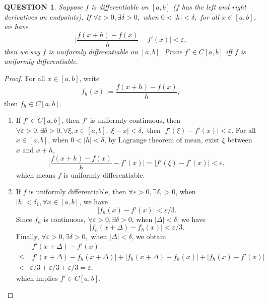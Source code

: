 \documentclass[12pt]{article}
\renewcommand{\(}{\left(}%
\renewcommand{\)}{\right)}%
\renewcommand{\[}{\left[}%
\renewcommand{\]}{\right]}%
\newtheorem{question}{QUESTION}[section]}
\newtheorem{proof}{Proof.}}
\begin{document}
  \begin{question}
   Suppose $f$ is differentiable on $[a,b]$ ($f$ has the left and right derivatives on endpoints). If $\forall\varepsilon>0,\exists\delta>0,$ when $0<|h|<\delta,$ for all $x\in[a,b]$, we have
   \begin{equation*}
    \bigg|\frac{f(x+h)-f(x)}{h}-f'(x)\bigg|<\varepsilon,
   \end{equation*}
   then we say $f$ is uniformly differentiable on $[a,b]$. Prove $f'\in C[a,b]$ iff $f$ is uniformly differentiable.
  \end{question}
  \begin{proof}
   For all $x\in[a,b]$, write
   \begin{equation*}
    f_h(x):=\frac{f(x+h)-f(x)}{h},
   \end{equation*}
   then $f_h\in C[a,b]$.
   \begin{enumerate}
    \item If $f'\in C[a,b]$, then $f'$ is uniformly continuous, then $\forall\varepsilon>0,\exists\delta>0,\forall \xi,x\in[a,b],|\xi-x |<\delta,$ then $|f'(\xi)-f'(x)|<\varepsilon$. For all $x\in[a,b]$, when $0<|h|<\delta$, by Lagrange theorem of mean, exist $\xi$ between $x$ and $x+h$,
    \begin{equation*}
     \bigg|\frac{f(x+h)-f(x)}{h}-f'(x)\bigg|=|f'(\xi )-f'(x)|<\varepsilon,
    \end{equation*}
    which means $f$ is uniformly differentiable.
    \item If $f$ is uniformly differentiable, then $\forall \varepsilon>0,\exists\delta_1>0$, when $|h|<\delta_1, \forall x\in[a,b]$, we have
    \begin{equation*}
     |f_h(x)-f'(x)|<\varepsilon/3.
    \end{equation*}
    Since $f_h$ is continuous, $\forall\varepsilon>0,\exists \delta>0$, when $|\Delta|<\delta$, we have
    \begin{equation*}
     |f_h(x+\Delta )-f_h(x )|<\varepsilon/3.
    \end{equation*}
    Finally, $\forall\varepsilon>0,\exists\delta>0,$ when $|\Delta |<\delta$, we obtain
    \begin{equation*}
     \begin{split}
      &|f'(x+\Delta )-f'(x)|\\
      \leq &|f'(x+\Delta )-f_h(x+\Delta )|+|f_h(x+\Delta )-f_h(x )|+|f_h(x)-f'(x)|\\
      <&\varepsilon/3+\varepsilon/3+\varepsilon/3=\varepsilon,
     \end{split}
    \end{equation*}
    which implies $f'\in C[a,b]$.
   \end{enumerate}
  \end{proof}
\end{document}
